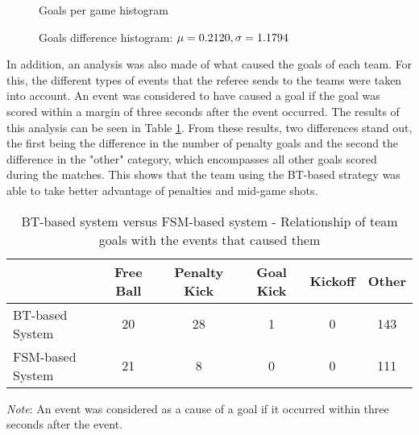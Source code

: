 \begin{figure}
    \begin{center}
        
    \end{center}
    \caption{Goals per game histogram}
    \label{fig:goals_diff_hist}
\end{figure}

\begin{figure}
    \begin{center}
        
    \end{center}
    \caption{Goals difference histogram: $\protect\mu = 0.2120, \sigma = 1.1794$}
    \label{fig:goals_per_game_hist}
\end{figure}

In addition, an analysis was also made of what caused the goals of each team. For this, the different types of events that the referee sends to the teams were taken into account. An event was considered to have caused a goal if the goal was scored within a margin of three seconds after the event occurred. The results of this analysis can be seen in Table \ref{tab:goals_reasons}. From these results, two differences stand out, the first being the difference in the number of penalty goals and the second the difference in the "other" category, which encompasses all other goals scored during the matches. This shows that the team using the BT-based strategy was able to take better advantage of penalties and mid-game shots.

\begin{table}[h]
    \begin{minipage}{\columnwidth}
        \centering
        \begin{tabular}{l c c c c c}
            \toprule
                             & Free Ball & Penalty Kick & Goal Kick & Kickoff & Other \\
            \midrule
            BT-based System  & 20        & 28           & 1         & 0       & 143   \\
            FSM-based System & 21        & 8            & 0         & 0       & 111   \\
            \bottomrule
        \end{tabular}
        \begin{center}
            \footnotesize
            \emph{Note}: An event was considered as a cause of a goal if it occurred within three seconds after the event.
        \end{center}
    \end{minipage}
    \caption{BT-based system versus FSM-based system - Relationship of team goals with the events that caused them}
    \label{tab:goals_reasons}
\end{table}

